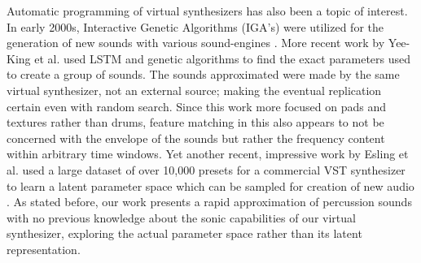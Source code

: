\documentclass{nime-alternate} %
\begin{document}
Automatic programming of virtual synthesizers has also been a topic of interest. In early 2000s, Interactive Genetic Algorithms (IGA's) were utilized for the generation of new sounds with various sound-engines \cite{johnson1999exploring,dahlstedt2001creating}. More recent work by Yee-King et al. \cite{yee2018automatic} used LSTM and genetic algorithms to find the exact parameters used to create a group of sounds. The sounds approximated were made by the same virtual synthesizer, not an external source; making the eventual replication certain even with random search. Since this work more focused on pads and textures rather than drums, feature matching in this also appears to not be concerned with the envelope of the sounds but rather the frequency content within arbitrary time windows. Yet another recent, impressive work by Esling et al. used a large dataset of over 10,000 presets for a commercial VST synthesizer to learn a latent parameter space which can be sampled for creation of new audio \cite{esling2019universal}. As stated before, our work presents a rapid approximation of percussion sounds with no previous knowledge about the sonic capabilities of our virtual synthesizer, exploring the actual parameter space rather than its latent representation. 
\end{document}
